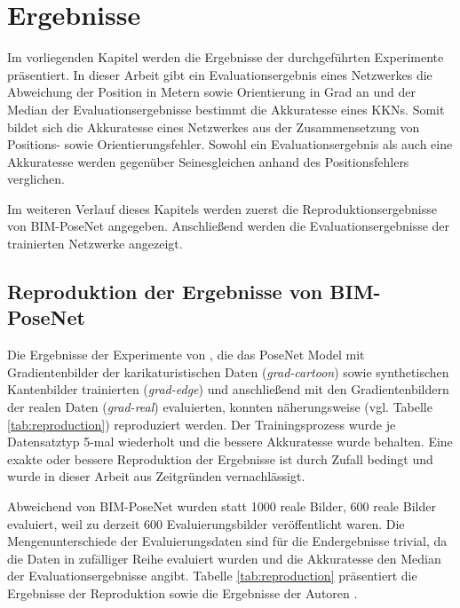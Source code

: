 
\section{Ergebnisse}
Im vorliegenden Kapitel werden die Ergebnisse der durchgeführten Experimente präsentiert. In dieser Arbeit gibt ein Evaluationsergebnis eines Netzwerkes die Abweichung der Position in Metern sowie Orientierung in Grad an und der Median der Evaluationsergebnisse bestimmt die Akkuratesse eines KKNs. Somit bildet sich die Akkuratesse eines Netzwerkes aus der Zusammensetzung von Positions- sowie Orientierungsfehler. Sowohl ein Evaluationsergebnis als auch eine Akkuratesse werden gegenüber Seinesgleichen anhand des Positionsfehlers verglichen.

Im weiteren Verlauf dieses Kapitels werden zuerst die Reproduktionsergebnisse von BIM-PoseNet \cite{acharyaBIMPoseNetIndoorCamera2019} angegeben. Anschließend werden die Evaluationsergebnisse der trainierten Netzwerke angezeigt.

\subsection{Reproduktion der Ergebnisse von BIM-PoseNet}
Die Ergebnisse der Experimente von \citet{acharyaBIMPoseNetIndoorCamera2019}, die das PoseNet Model mit Gradientenbilder der karikaturistischen Daten (\textit{grad-cartoon}) sowie synthetischen Kantenbilder trainierten (\textit{grad-edge}) und anschließend mit den Gradientenbildern der realen Daten (\textit{grad-real}) evaluierten, konnten näherungsweise (vgl. Tabelle \ref{tab:reproduction}) reproduziert werden. Der Trainingsprozess wurde je Datensatztyp 5-mal wiederholt und die bessere Akkuratesse wurde behalten. Eine exakte oder bessere Reproduktion der Ergebnisse ist durch Zufall bedingt und wurde in dieser Arbeit aus Zeitgründen vernachlässigt.

Abweichend von BIM-PoseNet wurden statt 1000 reale Bilder, 600 reale Bilder evaluiert, weil zu derzeit 600 Evaluierungsbilder veröffentlicht waren. Die Mengenunterschiede der Evaluierungsdaten sind für die Endergebnisse trivial, da die Daten in zufälliger Reihe evaluiert wurden und die Akkuratesse den Median der Evaluationsergebnisse angibt. Tabelle \ref{tab:reproduction} präsentiert die Ergebnisse der Reproduktion sowie die Ergebnisse der Autoren \citet{acharyaBIMPoseNetIndoorCamera2019}.


